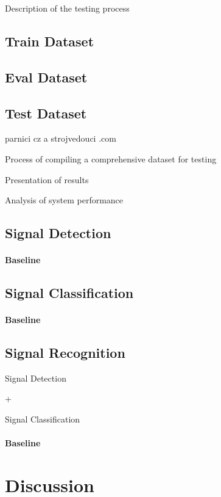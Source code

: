 \documentclass[english, ing, kiv, he, iso690alph, pdf, viewonly]{fasthesis}
\begin{document}
Description of the testing process


\section{Train Dataset}

\section{Eval Dataset}

\section{Test Dataset}
 parnici cz a strojvedouci .com

 
Process of compiling a comprehensive dataset for testing


Presentation of results


Analysis of system performance


\section{Signal Detection}

\subsubsection{Baseline}


\section{Signal Classification}


\subsubsection{Baseline}


\section{Signal Recognition}


Signal Detection


+


Signal Classification


\subsubsection{Baseline}


\chapter{Discussion}
\end{document}

